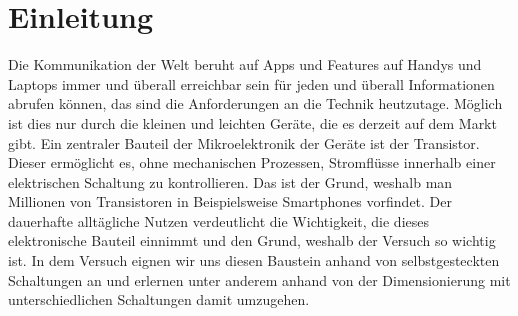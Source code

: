 

\chapter{Einleitung}
\label{chap:einleitung}

Die Kommunikation der Welt beruht auf Apps und Features auf Handys und Laptops immer und überall erreichbar sein für jeden und überall Informationen abrufen können, das sind die Anforderungen an die Technik heutzutage. Möglich ist dies nur durch die kleinen und leichten Geräte, die es derzeit auf dem Markt gibt. Ein zentraler Bauteil der Mikroelektronik der Geräte ist der Transistor. Dieser ermöglicht es, ohne mechanischen Prozessen, Stromflüsse innerhalb einer elektrischen Schaltung zu kontrollieren. Das ist der Grund, weshalb man Millionen von Transistoren in Beispielsweise Smartphones vorfindet. Der dauerhafte alltägliche Nutzen verdeutlicht die Wichtigkeit, die dieses elektronische Bauteil einnimmt und den Grund, weshalb der Versuch so wichtig ist. In dem Versuch eignen wir uns diesen Baustein anhand von selbstgesteckten Schaltungen an und erlernen unter anderem anhand von der Dimensionierung mit unterschiedlichen Schaltungen damit umzugehen.